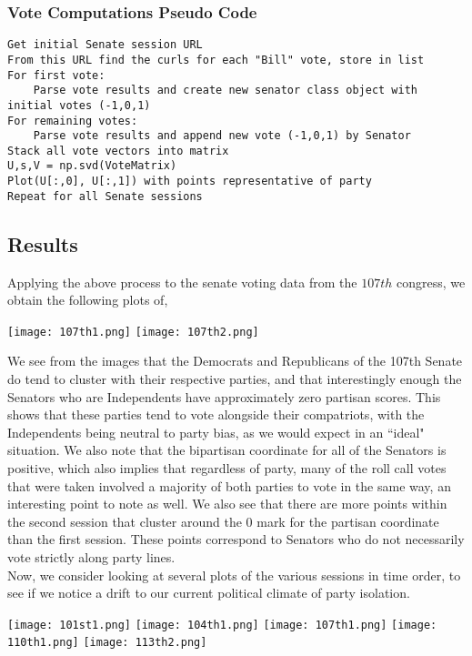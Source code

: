 \documentclass[letterpaper,12pt]{article}
\begin{document}
\subsubsection{Vote Computations Pseudo Code}
\begin{verbatim}
Get initial Senate session URL
From this URL find the curls for each "Bill" vote, store in list
For first vote:
    Parse vote results and create new senator class object with initial votes (-1,0,1)
For remaining votes:
    Parse vote results and append new vote (-1,0,1) by Senator
Stack all vote vectors into matrix
U,s,V = np.svd(VoteMatrix)
Plot(U[:,0], U[:,1]) with points representative of party
Repeat for all Senate sessions
\end{verbatim}
\subsection{Results}
Applying the above process to the senate voting data from the $107th$ congress, we obtain the following plots of,
\begin{center}
\texttt{[image: 107th1.png]}
\texttt{[image: 107th2.png]}
\end{center}
We see from the images that the Democrats and Republicans of the 107th Senate do tend to cluster with their respective parties, and that interestingly enough the Senators who are Independents have approximately zero partisan scores. This shows that these parties tend to vote alongside their compatriots, with the Independents being neutral to party bias, as we would expect in an ``ideal" situation. We also note that the bipartisan coordinate for all of the Senators is positive, which also implies that regardless of party, many of the roll call votes that were taken involved a majority of both parties to vote in the same way, an interesting point to note as well. We also see that there are more points within the second session that cluster around the 0 mark for the partisan coordinate than the first session. These points correspond to Senators who do not necessarily vote strictly along party lines.\\
Now, we consider looking at several plots of the various sessions in time order, to see if we notice a drift to our current political climate of party isolation.
\begin{center}
\texttt{[image: 101st1.png]}
\texttt{[image: 104th1.png]}
\texttt{[image: 107th1.png]}
\texttt{[image: 110th1.png]}
\texttt{[image: 113th2.png]}
\end{center}
\end{document}
